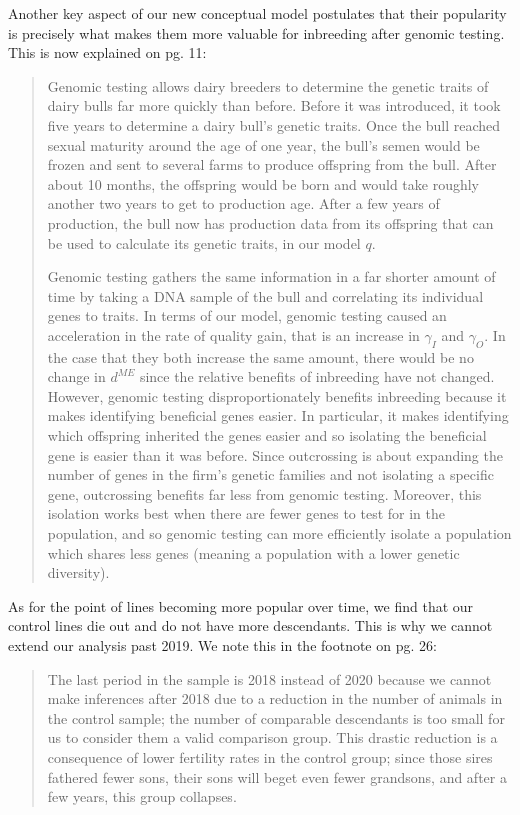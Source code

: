 \documentclass[12pt,letterpaper]{article}
\begin{document}
Another key aspect of our new conceptual model postulates that their popularity is precisely what makes them more valuable for inbreeding after genomic testing. This is now explained on pg. 11:

\begin{quote}
Genomic testing allows dairy breeders to determine the genetic traits of dairy bulls far more quickly than before.
Before it was introduced, it took five years to determine a dairy bull's genetic traits.
Once the bull reached sexual maturity around the age of one year, the bull's semen would be frozen and sent to several farms to produce offspring from the bull.
After about 10 months, the offspring would be born and would take roughly another two years to get to production age. 
After a few years of production, the bull now has production data from its offspring that can be used to calculate its genetic traits, in our model $q$.

Genomic testing gathers the same information in a far shorter amount of time by taking a DNA sample of the bull and correlating its individual genes to traits.
In terms of our model, genomic testing caused an acceleration in the rate of quality gain, that is an increase in $\gamma_I$ and $\gamma_O$.
In the case that they both increase the same amount, there would be no change in $d^{ME}$ since the relative benefits of inbreeding have not changed.
However, genomic testing disproportionately benefits inbreeding because it makes identifying beneficial genes easier.
In particular, it makes identifying which offspring inherited the genes easier and so isolating the beneficial gene is easier than it was before.
Since outcrossing is about expanding the number of genes in the firm's genetic families and not isolating a specific gene, outcrossing benefits far less from genomic testing.
Moreover, this isolation works best when there are fewer genes to test for in the population, and so genomic testing can more efficiently isolate a population which shares less genes (meaning a population with a lower genetic diversity).
\end{quote}

As for the point of lines becoming more popular over time, we find that our control lines die out and do not have more descendants. This is why we cannot extend our analysis past 2019. We note this in the footnote on pg. 26:

\begin{quote}
    The last period in the sample is 2018 instead of 2020 because we cannot make inferences after 2018 due to a reduction in the number of animals in the control sample; the number of comparable descendants is too small for us to consider them a valid comparison group. This drastic reduction is a consequence of lower fertility rates in the control group; since those sires fathered fewer sons, their sons will beget even fewer grandsons, and after a few years, this group collapses.
\end{quote}
\end{document}
